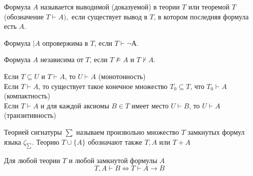 \begin{defn}
Формула $A$ называется выводимой (доказуемой) в теории $T$ или теоремой $T$ (обозначение $T \vdash A),$ если существует вывод в $T$, в котором последняя формула есть $A$.
\end{defn}
\begin{defn}
Формула $\mid A$ опровержима в $T$, если $T \vdash \neg А$.
\end{defn}
\begin{defn}
Формула $A$ независима от $T$, если $T \not \models A$ и $T \not \vdash A$.
\end{defn}
\vskip 0.1in
Если $T \subseteq U$ и $T \vdash A$, то $U \vdash A$ (монотонность)\\
Если $T \vdash A$, то существует такое конечное множество $T_0 \subseteq T$, что $T_0 \vdash A$ (компактность)\\
Если $T \vdash A$ и для каждой аксиомы $B \in T$ имеет место $U \vdash B$, то $U \vdash A$ (транзитивность)
\vskip 0.2in

\begin{defn}
Теорией сигнатуры $\sum$ называем произвольно множество $T$ замкнутых формул языка $\zeta_{\sum}$. Теорию $T \cup \{A\}$ обозначают также $T,A$ или $T + A$
\end{defn}

\begin{theo}
Для любой теории $T$ и любой замкнутой формулы $A$
$$
T, A \vdash B \Leftrightarrow T \vdash A \to B
$$
\end{theo}

